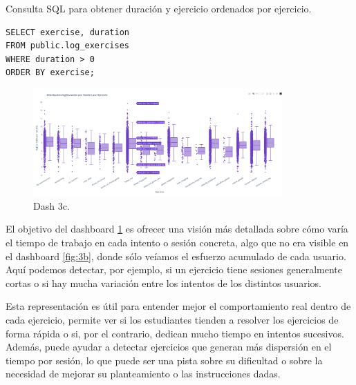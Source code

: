 \documentclass[a4paper, 12pt]{book}
\begin{document}
\begin{listing}[h!]
    \caption{Consulta SQL para obtener duración y ejercicio ordenados por ejercicio.}{}
    \label{lst:sql_duration_ordered_by_exercise}
    \begin{verbatim}
SELECT exercise, duration
FROM public.log_exercises
WHERE duration > 0
ORDER BY exercise;
    \end{verbatim}
\end{listing}

\begin{figure}
  \centering
  \includegraphics[width=0.85\textwidth, keepaspectratio]{img/3c.png}
  \caption{Dash 3c.}\label{fig:3c}
\end{figure}

El objetivo del dashboard \ref{fig:3c} es ofrecer una visión más detallada sobre cómo varía el tiempo de trabajo en cada intento o sesión concreta, algo que no era visible en el dashboard \ref{fig:3b}, donde sólo veíamos el esfuerzo acumulado de cada usuario. Aquí podemos detectar, por ejemplo, si un ejercicio tiene sesiones generalmente cortas o si hay mucha variación entre los intentos de los distintos usuarios.

Esta representación es útil para entender mejor el comportamiento real dentro de cada ejercicio, permite ver si los estudiantes tienden a resolver los ejercicios de forma rápida o si, por el contrario, dedican mucho tiempo en intentos sucesivos. Además, puede ayudar a detectar ejercicios que generan más dispersión en el tiempo por sesión, lo que puede ser una pista sobre su dificultad o sobre la necesidad de mejorar su planteamiento o las instrucciones dadas.


\cleardoublepage

\end{document}
